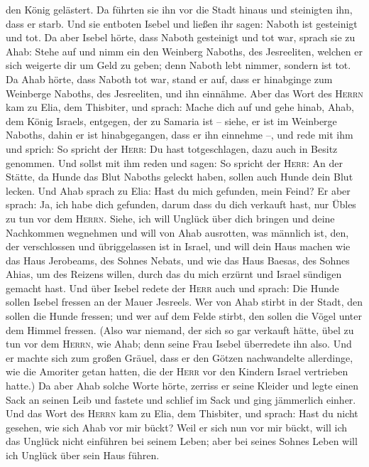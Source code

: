 den König gelästert. Da führten sie ihn vor die Stadt hinaus und
steinigten ihn, dass er starb.  Und sie entboten Isebel
und ließen ihr sagen: Naboth ist gesteinigt und tot.  Da
aber Isebel hörte, dass Naboth gesteinigt und tot war, sprach sie zu
Ahab: Stehe auf und nimm ein den Weinberg Naboths, des Jesreeliten,
welchen er sich weigerte dir um Geld zu geben; denn Naboth lebt nimmer,
sondern ist tot.  Da Ahab hörte, dass Naboth tot war,
stand er auf, dass er hinabginge zum Weinberge Naboths, des Jesreeliten,
und ihn einnähme.  Aber das Wort des \textsc{Herrn} kam
zu Elia, dem Thisbiter, und sprach:  Mache dich auf und
gehe hinab, Ahab, dem König Israels, entgegen, der zu Samaria ist --
siehe, er ist im Weinberge Naboths, dahin er ist hinabgegangen, dass er
ihn einnehme --,  und rede mit ihm und sprich: So spricht
der \textsc{Herr}: Du hast totgeschlagen, dazu auch in Besitz genommen.
Und sollst mit ihm reden und sagen: So spricht der \textsc{Herr}: An der
Stätte, da Hunde das Blut Naboths geleckt haben, sollen auch Hunde dein
Blut lecken.  Und Ahab sprach zu Elia: Hast du mich
gefunden, mein Feind? Er aber sprach: Ja, ich habe dich gefunden, darum
dass du dich verkauft hast, nur Übles zu tun vor dem \textsc{Herrn}.
 Siehe, ich will Unglück über dich bringen und deine
Nachkommen wegnehmen und will von Ahab ausrotten, was männlich ist, den,
der verschlossen und übriggelassen ist in Israel,  und
will dein Haus machen wie das Haus Jerobeams, des Sohnes Nebats, und wie
das Haus Baesas, des Sohnes Ahias, um des Reizens willen, durch das du
mich erzürnt und Israel sündigen gemacht hast.  Und über
Isebel redete der \textsc{Herr} auch und sprach: Die Hunde sollen Isebel
fressen an der Mauer Jesreels.  Wer von Ahab stirbt in
der Stadt, den sollen die Hunde fressen; und wer auf dem Felde stirbt,
den sollen die Vögel unter dem Himmel fressen.  (Also war
niemand, der sich so gar verkauft hätte, übel zu tun vor dem
\textsc{Herrn}, wie Ahab; denn seine Frau Isebel überredete ihn also.
 Und er machte sich zum großen Gräuel, dass er den Götzen
nachwandelte allerdinge, wie die Amoriter getan hatten, die der
\textsc{Herr} vor den Kindern Israel vertrieben hatte.) 
Da aber Ahab solche Worte hörte, zerriss er seine Kleider und legte
einen Sack an seinen Leib und fastete und schlief im Sack und ging
jämmerlich einher.  Und das Wort des \textsc{Herrn} kam
zu Elia, dem Thisbiter, und sprach:  Hast du nicht
gesehen, wie sich Ahab vor mir bückt? Weil er sich nun vor mir bückt,
will ich das Unglück nicht einführen bei seinem Leben; aber bei seines
Sohnes Leben will ich Unglück über sein Haus führen.

